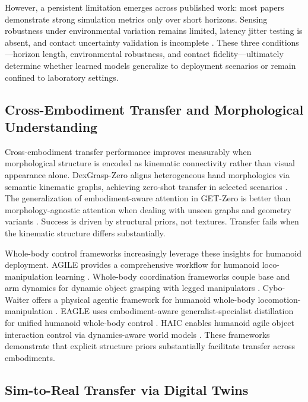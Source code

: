 \documentclass[12pt,a4paper,oneside]{report}
\begin{document}
However, a persistent limitation emerges across published work: most papers demonstrate strong simulation metrics only over short horizons. Sensing robustness under environmental variation remains limited, latency jitter testing is absent, and contact uncertainty validation is incomplete \cite{lou2024robogs, pan2025selfcorrecting}. These three conditions---horizon length, environmental robustness, and contact fidelity---ultimately determine whether learned models generalize to deployment scenarios or remain confined to laboratory settings.
\subsection{Cross-Embodiment Transfer and Morphological Understanding}
\label{subsec:cross_embodiment_transfer_and_morphological_understanding}

Cross-embodiment transfer performance improves measurably when morphological structure is encoded as kinematic connectivity rather than visual appearance alone. DexGrasp-Zero aligns heterogeneous hand morphologies via semantic kinematic graphs, achieving zero-shot transfer in selected scenarios \cite{wu2025dexgrasp}. The generalization of embodiment-aware attention in GET-Zero is better than morphology-agnostic attention when dealing with unseen graphs and geometry variants \cite{patel2024getzero}. Success is driven by structural priors, not textures. Transfer fails when the kinematic structure differs substantially.

Whole-body control frameworks increasingly leverage these insights for humanoid deployment. AGILE provides a comprehensive workflow for humanoid loco-manipulation learning \cite{zhao2026agile}. Whole-body coordination frameworks couple base and arm dynamics for dynamic object grasping with legged manipulators \cite{liang2025wholebody}. Cybo-Waiter offers a physical agentic framework for humanoid whole-body locomotion-manipulation \cite{ren2026cybowaiter}. EAGLE uses embodiment-aware generalist-specialist distillation for unified humanoid whole-body control \cite{peng2026eagle}. HAIC enables humanoid agile object interaction control via dynamics-aware world models \cite{li2026haic}. These frameworks demonstrate that explicit structure priors substantially facilitate transfer across embodiments.
\subsection{Sim-to-Real Transfer via Digital Twins}
\label{subsec:sim_to_real_transfer_via_digital_twins}
\end{document}
